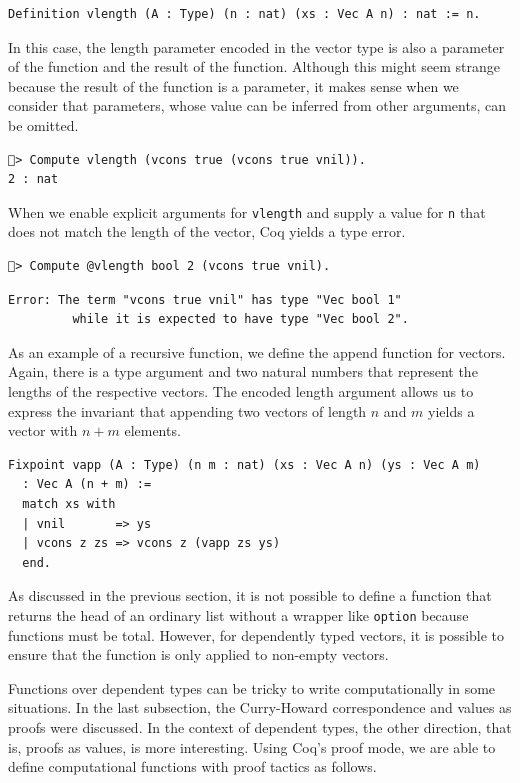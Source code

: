 \documentclass[a4paper, 11pt, fleqn, twoside, abstract=on]{scrreprt}
\newcommand{\cinl}[1]{\texttt{#1}}
\begin{document}
\begin{verbatim}
Definition vlength (A : Type) (n : nat) (xs : Vec A n) : nat := n.
\end{verbatim}
\noindent
In this case, the length parameter encoded in the vector type is also a parameter of the function and the result of the function.
Although this might seem strange because the result of the function is a parameter, it makes sense when we consider that parameters, whose value can be inferred from other arguments, can be omitted.

\begin{verbatim}
🐔> Compute vlength (vcons true (vcons true vnil)).
2 : nat
\end{verbatim}

When we enable explicit arguments for \cinl{vlength} and supply a value for \cinl{n} that does not match the length of the vector, Coq yields a type error.

\begin{verbatim}
🐔> Compute @vlength bool 2 (vcons true vnil).
\end{verbatim}
\vspace*{-18pt}
\begin{verbatim}
Error: The term "vcons true vnil" has type "Vec bool 1"
         while it is expected to have type "Vec bool 2".
\end{verbatim}

As an example of a recursive function, we define the append function for vectors.
Again, there is a type argument and two natural numbers that represent the lengths of the respective vectors.
The encoded length argument allows us to express the invariant that appending two vectors of length $n$ and $m$ yields a vector with $n + m$ elements.

\begin{verbatim}
Fixpoint vapp (A : Type) (n m : nat) (xs : Vec A n) (ys : Vec A m) 
  : Vec A (n + m) :=
  match xs with
  | vnil       => ys
  | vcons z zs => vcons z (vapp zs ys)
  end.
\end{verbatim}

As discussed in the previous section, it is not possible to define a function that returns the head of an ordinary list without a wrapper like \cinl{option} because functions must be total.
However, for dependently typed vectors, it is possible to ensure that the function is only applied to non-empty vectors.

Functions over dependent types can be tricky to write computationally in some situations.
In the last subsection, the Curry-Howard correspondence and values as proofs were discussed.
In the context of dependent types, the other direction, that is, proofs as values, is more interesting.
Using Coq's proof mode, we are able to define computational functions with proof tactics as follows.
\end{document}
